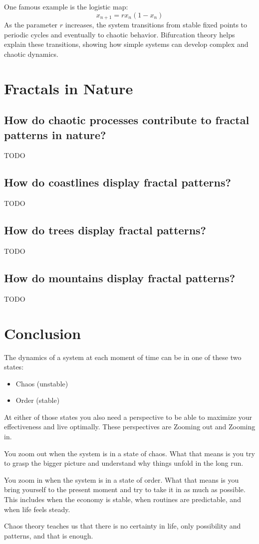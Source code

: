 \documentclass[12pt]{article}
\begin{document}
One famous example is the logistic map:
\[
x_{n+1} = r x_n (1 - x_n)
\]
As the parameter \( r \) increases, the system transitions from stable fixed points to periodic cycles and eventually to chaotic behavior. Bifurcation theory helps explain these transitions, showing how simple systems can develop complex and chaotic dynamics.


\section{Fractals in Nature}
\subsection{How do chaotic processes contribute to fractal patterns in nature?}
TODO

\subsection{How do coastlines display fractal patterns?}
TODO

\subsection{How do trees display fractal patterns?}
TODO

\subsection{How do mountains display fractal patterns?}
TODO

\section{Conclusion}

The dynamics of a system at each moment of time can be in one of these two states:
\begin{itemize}
    \item Chaos (unstable)
    \item Order (stable)
\end{itemize}


At either of those states you also need a perspective to be able to maximize your effectiveness and live optimally. These perspectives are Zooming out and Zooming in. 

You zoom out when the system is in a state of chaos. What that means is you try to grasp the bigger picture and understand why things unfold in the long run.

You zoom in when the system is in a state of order. What that means is you bring yourself to the present moment and try to take it in as much as possible. This includes when the economy is stable, when routines are predictable, and when life feels steady.

Chaos theory teaches us that there is no certainty in life, only possibility and patterns, and that is enough.


\nocite{*} 
 

\end{document}
